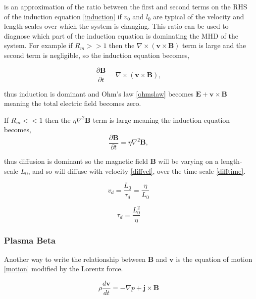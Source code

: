 \documentclass[11pt]{article}
\renewcommand{\vec}[1]{\mathbf{#1}}
\begin{document}
is an approximation of the ratio between the first and second terms on the RHS of the induction equation \ref{induction} if $v_0$ and $l_0$ are typical of the velocity and length-scales over which the system is changing. This ratio can be used to diagnose which part of the induction equation is dominating the MHD of the system. For example if $R_m >> 1$ then the $\nabla\times(\vec{v}\times\vec{B})$ term is large and the second term is negligible, so the induction equation becomes,

\begin{equation}\label{r>>1}
\frac{\partial \vec{B}}{\partial t}=\nabla\times(\vec{v}\times\vec{B}),
\end{equation}

thus induction is dominant and Ohm's law \ref{ohmslaw} becomes $\vec{E} +\vec{v}\times\vec{B}$ meaning the total electric field becomes zero.



If $R_m << 1$ then the $\eta\nabla^{2}\vec{B}$ term is large meaning the induction equation becomes,
\begin{equation}\label{r<<1}
\frac{\partial \vec{B}}{\partial t}=\eta\nabla^{2}\vec{B},
\end{equation}

thus diffusion is dominant so the magnetic field $\vec{B}$ will be varying on a length-scale $L_0$, and so will diffuse with velocity \ref{diffvel}, over the time-scale \ref{difftime}.

\begin{equation}\label{diffvel}
v_d=\frac{L_0}{\tau_d} = \frac{\eta}{L_0}
\end{equation}


\begin{equation}\label{difftime}
\tau_d = \frac{L_{0}^{2}}{\eta}
\end{equation}

\citep{2003dysu.book.....D}

%
\subsubsection{Plasma Beta}
Another way to write the relationship between $\vec{B}$ and $\vec{v}$ is the equation of motion \ref{motion} modified by the Lorentz force.

\begin{equation}\label{motion1}
\rho\frac{d\vec{v}}{dt}=-\nabla p+\vec{j}\times\vec{B}
\end{equation}
\end{document}
